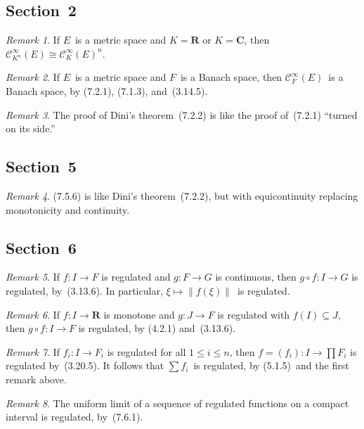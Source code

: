 \documentclass[letterpaper,12pt]{article}
\newcommand{\R}{\mathbf{R}}
\newcommand{\C}{\mathbf{C}}
\newcommand{\BC}{\mathcal{C}^{\infty}}
\newcommand{\after}{\circ}
\newcommand{\iso}{\cong}
\newcommand{\norm}[1]{\lVert{#1}\rVert}
\theoremstyle{plain}
\theoremstyle{definition}
\theoremstyle{remark}
\newtheorem*{rmk}{Remark}
\begin{document}
\subsection*{Section~2}
\begin{rmk}
If \(E\)~is a metric space and \(K=\R\) or \(K=\C\), then \(\BC_{K^n}(E)\iso\BC_K(E)^n\).
\end{rmk}

\begin{rmk}
If \(E\)~is a metric space and \(F\)~is a Banach space, then \(\BC_F(E)\)~is a Banach space, by (7.2.1), (7.1.3), and~(3.14.5).
\end{rmk}

\begin{rmk}
The proof of Dini's theorem~(7.2.2) is like the proof of~(7.2.1) ``turned on its side.''
\end{rmk}

\subsection*{Section~5}
\begin{rmk}
(7.5.6) is like Dini's theorem~(7.2.2), but with equicontinuity replacing monotonicity and continuity.
\end{rmk}

\subsection*{Section~6}
\begin{rmk}
If \(f:I\to F\) is regulated and \(g:F\to G\) is continuous, then \(g\after f:I\to G\) is regulated, by~(3.13.6). In particular, \(\xi\mapsto\norm{f(\xi)}\)~is regulated.
\end{rmk}

\begin{rmk}
If \(f:I\to\R\) is monotone and \(g:J\to F\) is regulated with \(f(I)\subseteq J\), then \(g\after f:I\to F\) is regulated, by (4.2.1) and~(3.13.6).
\end{rmk}

\begin{rmk}
If \(f_i:I\to F_i\) is regulated for all \(1\le i\le n\), then \(f=(f_i):I\to\prod F_i\) is regulated by~(3.20.5). It follows that \(\sum f_i\)~is regulated, by (5.1.5)~and the first remark above.
\end{rmk}

\begin{rmk}
The uniform limit of a sequence of regulated functions on a compact interval is regulated, by~(7.6.1).
\end{rmk}
\end{document}
